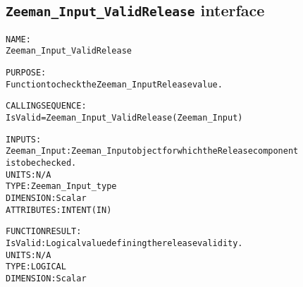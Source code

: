 \subsection{\texttt{Zeeman\_Input\_ValidRelease} interface}
  \label{sec:Zeeman_Input_ValidRelease_interface}
  \begin{alltt}
 
  NAME:
        Zeeman_Input_ValidRelease
 
  PURPOSE:
        Function to check the Zeeman_Input Release value.
 
  CALLING SEQUENCE:
        IsValid = Zeeman_Input_ValidRelease( Zeeman_Input )
 
  INPUTS:
        Zeeman_Input:  Zeeman_Input object for which the Release component
                       is to be checked.
                       UNITS:      N/A
                       TYPE:       Zeeman_Input_type
                       DIMENSION:  Scalar
                       ATTRIBUTES: INTENT(IN)
 
  FUNCTION RESULT:
        IsValid:       Logical value defining the release validity.
                       UNITS:      N/A
                       TYPE:       LOGICAL
                       DIMENSION:  Scalar
 
  \end{alltt}
